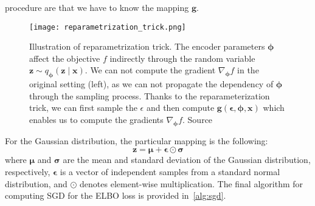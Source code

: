 procedure are that we have to know the mapping $\mathbf{g}$.
\begin{figure}[t]
    \centering
    \texttt{[image: reparametrization\_trick.png]}
    \caption[Reparametrization trick]{Illustration of reparametrization trick. The encoder parameters ${\boldsymbol{\phi}}$ affect the objective $f$ indirectly through 
    the random variable $\mathbf{z} \sim  q_{\boldsymbol{\phi}}(\mathbf{z}\mid \mathbf{x})$. We can not compute the gradient $\nabla_{\boldsymbol{\phi}} f$ in the 
    original setting (left), as we can not propagate the dependency of ${\boldsymbol{\phi}}$ through the sampling process. Thanks to the reparameterization trick, 
    we can first sample the $\epsilon$ and then compute $\mathbf{g}(\boldsymbol{\epsilon},{\boldsymbol{\phi}},\mathbf{x})$ which enables us to compute the 
    gradients $\nabla_{\boldsymbol{\phi}} f$.
    Source~\cite{intro-vae-2019}}
    \label{fig:reparam_trick}
\end{figure}
For the Gaussian distribution, the particular mapping is the following:
$$
\mathbf{z} = \boldsymbol{\mu} + \boldsymbol{\epsilon} \odot \boldsymbol{\sigma}
$$
where $\boldsymbol{\mu}$ and $\boldsymbol{\sigma}$ are the mean and standard deviation of the Gaussian distribution, respectively, 
$\boldsymbol{\epsilon}$ is a vector of independent samples from a standard normal distribution, and $\odot$ denotes element-wise 
multiplication. The final algorithm for computing SGD for the ELBO loss is provided in~\ref{alg:sgd}.
